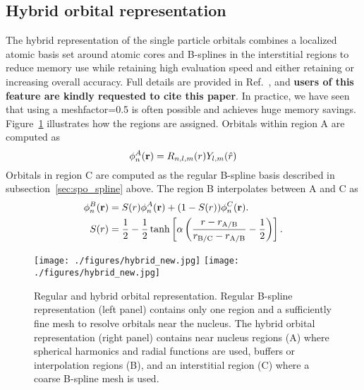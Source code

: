 \subsection{Hybrid orbital representation}
\label{sec:spo_hybrid}
The hybrid representation of the single particle orbitals combines a localized atomic basis set around atomic cores and B-splines in the interstitial regions to reduce memory use while retaining high evaluation speed and either retaining or increasing overall accuracy. Full details are provided in Ref.~\cite{Luo2018hyb}, and \textbf{users of this feature are kindly requested to cite this paper}.
In practice, we have seen that using a meshfactor=0.5 is often possible and achieves huge memory savings.
Figure~\ref{fig:hybridrep} illustrates how the regions are assigned. Orbitals within region A are computed as
\[
  \phi^A_n({\bf r})=R_{n,l,m}(r)Y_{l,m}(\hat{r})
\]
Orbitals in region C are computed as the regular B-spline basis described in subsection~\ref{sec:spo_spline} above. The region B interpolates between A and C as
\begin{align}
  \phi^B_n({\bf r}) &= S(r) \phi^A_n({\bf r}) + (1-S(r))\phi^C_n({\bf r}) .\\
                S(r) &= \frac{1}{2}-\frac{1}{2}\tanh\left[\alpha\left(\frac{r-r_{\rm A/B}}{r_{\rm B/C}-r_{\rm A/B}}-\frac{1}{2}\right)\right] .
\end{align}

\begin{figure}
\centering
\texttt{[image: ./figures/hybrid\_new.jpg]}
\qquad
\texttt{[image: ./figures/hybrid\_new.jpg]}
\caption{Regular and hybrid orbital representation. Regular B-spline representation (left panel) contains only one region and a sufficiently fine mesh to resolve orbitals near the nucleus. The hybrid orbital representation (right panel) contains near nucleus regions (A) where spherical harmonics and radial functions are used, buffers or interpolation regions (B), and an interstitial region (C) where a coarse B-spline mesh is used.}
\label{fig:hybridrep}
\end{figure}

